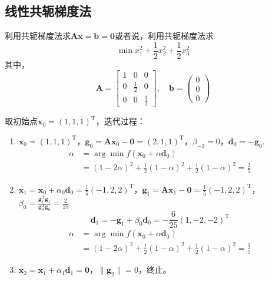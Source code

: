 \subsection{线性共轭梯度法}
\begin{example}
    利用共轭梯度法求$\boldsymbol{Ax} = \boldsymbol{b} = \boldsymbol{0}$或者说，利用共轭梯度法求\quad{}
    \[
        \min x_1^2+\dfrac{1}{2}x_2^2+\dfrac{1}{2}x_3^2
    \]
    其中，
    \[
        \boldsymbol{A} = \begin{bmatrix}
            1 & 0 & 0\\
            0 & \frac{1}{2} & 0 \\
            0 & 0 & \frac{1}{2}
        \end{bmatrix},\quad
        \boldsymbol{b} = \begin{pmatrix}
            0\\0\\0
        \end{pmatrix}
    \]

    \begin{solution}
        取初始点$\boldsymbol{x}_0 = (1,1,1)^{\mathrm{T}} $，迭代过程：
        \begin{enumerate}
            \item $\boldsymbol{x}_0 = (1,1,1)^{\mathrm{T}} $，$\boldsymbol{g}_0 = \boldsymbol{Ax}_0-\boldsymbol{0} = (2,1,1)^{\mathrm{T}}$，$\beta_{-1} = 0$，$\boldsymbol{d}_{0} = -\boldsymbol{g}_0$.
            \[
                \begin{array}{ll}
                    \alpha &= \arg\min f(\boldsymbol{x}_0+\alpha \boldsymbol{d}_0)\\
                    & = (1-2\alpha)^2+\frac{1}{2}(1-\alpha)^2+\frac{1}{2}(1-\alpha)^2 = \frac{3}{5}
                \end{array}
            \]
            \item $\boldsymbol{x}_1 = \boldsymbol{x}_0+\alpha_0\boldsymbol{d}_0=\frac{1}{5}(-1,2,2)^{\mathrm{T}} $，$\boldsymbol{g}_1 = \boldsymbol{Ax}_1-\boldsymbol{0} = \frac{1}{5}(-1,2,2)^{\mathrm{T}}$，$\beta_{0} = \frac{\boldsymbol{g}_1^{\mathrm{T}}\boldsymbol{g}_1}{\boldsymbol{g}_0^{\mathrm{T}}\boldsymbol{g}_0}= \frac{2}{25}$ 
            \[
                \boldsymbol{d}_{1} = -\boldsymbol{g}_1+\beta_{0}\boldsymbol{d}_0 = -\frac{6}{25}(1,-2,-2)^{\mathrm{T}}
            \]
            \[
                \begin{array}{ll}
                    \alpha &= \arg\min f(\boldsymbol{x}_0+\alpha \boldsymbol{d}_0)\\
                    & = (1-2\alpha)^2+\frac{1}{2}(1-\alpha)^2+\frac{1}{2}(1-\alpha)^2 = \frac{3}{5}
                \end{array}
            \]
            \item $\boldsymbol{x}_2 = \boldsymbol{x}_1 + \alpha_1\boldsymbol{d}_1 = \boldsymbol{0}$，$\|\boldsymbol{g}_2\| = 0$，终止。
        \end{enumerate}


\end{solution}
\end{example}
